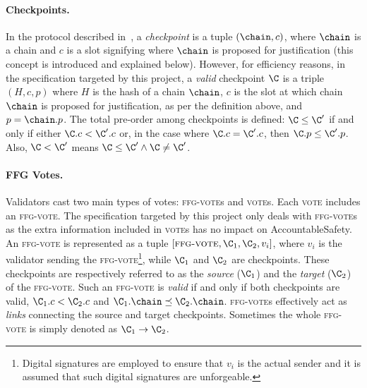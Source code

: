 \paragraph{Checkpoints.}
In the protocol described in~\cite{d20243}, a \emph{checkpoint} is a tuple $(\chain, c)$, where \(\chain \) is a chain and \( c \) is a slot signifying where \( \chain \) is proposed for justification (this concept is introduced and explained below).
However, for efficiency reasons, in the specification targeted by this project, a \emph{valid} checkpoint $\C$ is a triple $(H, c, p)$ where $H$ is the hash of a chain $\chain$, $c$ is the slot at which chain $\chain$ is proposed for justification, as per the definition above, and $p =  \chain.p$.
The total pre-order among checkpoints is defined:
$\C \leq \C'$ if and only if either \(\C.c < \C'.c\) or, in the case where \(\C.c = \C'.c\), then \(\C.p \leq \C'.p\). 
Also, $\C < \C'$ means $\C \leq \C' \land \C \neq \C'$.


\paragraph*{FFG Votes.}
Validators cast two main types of votes: \textsc{ffg-vote}s and \textsc{vote}s. 
Each \textsc{vote} includes an \textsc{ffg-vote}.
The specification targeted by this project only deals with \textsc{ffg-vote}s as the extra information included in  \textsc{vote}s has no impact on AccountableSafety.
An \textsc{ffg-vote} is represented as a tuple \([\textsc{ffg-vote}, \C_1, \C_2, v_i]\), where {$v_i$ is the validator sending the \textsc{ffg-vote}\footnote{Digital signatures are employed to ensure that $v_i$ is the actual sender and it is assumed that such digital signatures are unforgeable.}, while} \(\C_1\) and \(\C_2\) are checkpoints.
These checkpoints are respectively referred to as the \emph{source} (\(\C_1\)) and the \emph{target} (\(\C_2\)) of the \textsc{ffg-vote}.
Such an \textsc{ffg-vote} is \emph{valid}
if and only if both checkpoints are valid, 
\(\C_1.c < \C_2.c\) and  \(\C_1.\chain \preceq \C_2.\chain\). 
\textsc{ffg-vote}s effectively act as \emph{links} connecting the source and target checkpoints. Sometimes the whole \textsc{ffg-vote} is simply denoted as \(\C_1 \to \C_2\).


